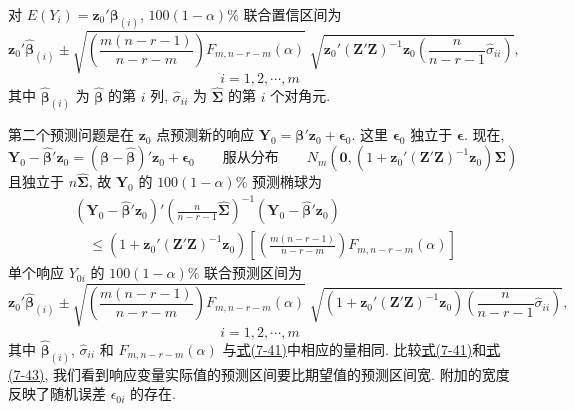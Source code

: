 对 $E(Y_i)=\mathbf{z}_0'\boldsymbol{\beta}_{(i)}$, $100(1-\alpha)\%$ 联合置信区间为
\label{eq:7-41}
\begin{equation}
\mathbf{z}_0'\hat{\boldsymbol{\beta}}_{(i)}\pm
\sqrt{\left(\frac{m(n-r-1)}{n-r-m}\right)F_{m,n-r-m}(\alpha)}\;
\sqrt{\mathbf{z}_0'(\mathbf{Z}'\mathbf{Z})^{-1}\mathbf{z}_0\left(\frac{n}{n-r-1}\hat{\sigma}_{ii}\right)},
\tag{7-41}
\end{equation}
\[
i=1,2,\cdots,m
\]
其中 $\hat{\boldsymbol{\beta}}_{(i)}$ 为 $\hat{\boldsymbol{\beta}}$ 的第 $i$ 列, $\hat{\sigma}_{ii}$ 为 $\hat{\boldsymbol{\Sigma}}$ 的第 $i$ 个对角元.

第二个预测问题是在 $\mathbf{z}_0$ 点预测新的响应 $\mathbf{Y}_0=\boldsymbol{\beta}'\mathbf{z}_0+\boldsymbol{\epsilon}_0$. 这里 $\boldsymbol{\epsilon}_0$ 独立于 $\boldsymbol{\epsilon}$. 现在,
\[
\mathbf{Y}_0-\hat{\boldsymbol{\beta}}'\mathbf{z}_0=(\boldsymbol{\beta}-\hat{\boldsymbol{\beta}})'\mathbf{z}_0+\boldsymbol{\epsilon}_0
\qquad\text{服从分布}\qquad
N_m(\mathbf{0},(1+\mathbf{z}_0'(\mathbf{Z}'\mathbf{Z})^{-1}\mathbf{z}_0)\boldsymbol{\Sigma})
\]
且独立于 $n\hat{\boldsymbol{\Sigma}}$, 故 $\mathbf{Y}_0$ 的 $100(1-\alpha)\%$ 预测椭球为
\label{eq:7-42}
\begin{equation}
\begin{aligned}
&(\mathbf{Y}_0-\hat{\boldsymbol{\beta}}'\mathbf{z}_0)'\left(\frac{n}{n-r-1}\hat{\boldsymbol{\Sigma}}\right)^{-1}(\mathbf{Y}_0-\hat{\boldsymbol{\beta}}'\mathbf{z}_0)\\
&\quad\leqslant(1+\mathbf{z}_0'(\mathbf{Z}'\mathbf{Z})^{-1}\mathbf{z}_0)\left[\left(\frac{m(n-r-1)}{n-r-m}\right)F_{m,n-r-m}(\alpha)\right]
\end{aligned}
\tag{7-42}
\end{equation}
单个响应 $Y_{0i}$ 的 $100(1-\alpha)\%$ 联合预测区间为
\label{eq:7-43}
\begin{equation}
\mathbf{z}_0'\hat{\boldsymbol{\beta}}_{(i)}\pm
\sqrt{\left(\frac{m(n-r-1)}{n-r-m}\right)F_{m,n-r-m}(\alpha)}\;
\sqrt{(1+\mathbf{z}_0'(\mathbf{Z}'\mathbf{Z})^{-1}\mathbf{z}_0)\left(\frac{n}{n-r-1}\hat{\sigma}_{ii}\right)},
\tag{7-43}
\end{equation}
\[
i=1,2,\cdots,m
\]
其中 $\hat{\boldsymbol{\beta}}_{(i)}$, $\hat{\sigma}_{ii}$ 和 $F_{m,n-r-m}(\alpha)$ 与\hyperref[eq:7-41]{式(7-41)}中相应的量相同. 比较\hyperref[eq:7-41]{式(7-41)}和\hyperref[eq:7-43]{式(7-43)}, 我们看到响应变量实际值的预测区间要比期望值的预测区间宽. 附加的宽度反映了随机误差 $\epsilon_{0i}$ 的存在.
